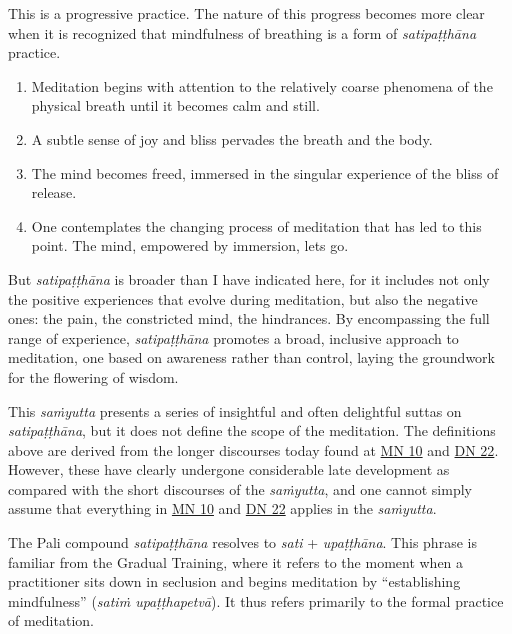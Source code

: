 \documentclass[12pt,openany]{book}%
\begin{document}
This is a progressive practice. The nature of this progress becomes more clear when it is recognized that mindfulness of breathing is a form of \textit{\textsanskrit{satipaṭṭhāna}} practice.

\begin{enumerate}%
\item Meditation begins with attention to the relatively coarse phenomena of the physical breath until it becomes calm and still.%
\item A subtle sense of joy and bliss pervades the breath and the body.%
\item The mind becomes freed, immersed in the singular experience of the bliss of release.%
\item One contemplates the changing process of meditation that has led to this point. The mind, empowered by immersion, lets go.%
\end{enumerate}

But \textit{\textsanskrit{satipaṭṭhāna}} is broader than I have indicated here, for it includes not only the positive experiences that evolve during meditation, but also the negative ones: the pain, the constricted mind, the hindrances. By encompassing the full range of experience, \textit{\textsanskrit{satipaṭṭhāna}} promotes a broad, inclusive approach to meditation, one based on awareness rather than control, laying the groundwork for the flowering of wisdom.

This \textit{\textsanskrit{saṁyutta}} presents a series of insightful and often delightful suttas on \textit{\textsanskrit{satipaṭṭhāna}}, but it does not define the scope of the meditation. The definitions above are derived from the longer discourses today found at \href{https://suttacentral.net/mn10}{MN 10} and \href{https://suttacentral.net/dn22}{DN 22}. However, these have clearly undergone considerable late development as compared with the short discourses of the \textit{\textsanskrit{saṁyutta}}, and one cannot simply assume that everything in \href{https://suttacentral.net/mn10}{MN 10} and \href{https://suttacentral.net/dn22}{DN 22} applies in the \textit{\textsanskrit{saṁyutta}}.

The Pali compound \textit{\textsanskrit{satipaṭṭhāna}} resolves to \textit{sati} + \textit{\textsanskrit{upaṭṭhāna}}. This phrase is familiar from the Gradual Training, where it refers to the moment when a practitioner sits down in seclusion and begins meditation by “establishing mindfulness” (\textit{\textsanskrit{satiṁ} \textsanskrit{upaṭṭhapetvā}}). It thus refers primarily to the formal practice of meditation.
\end{document}
